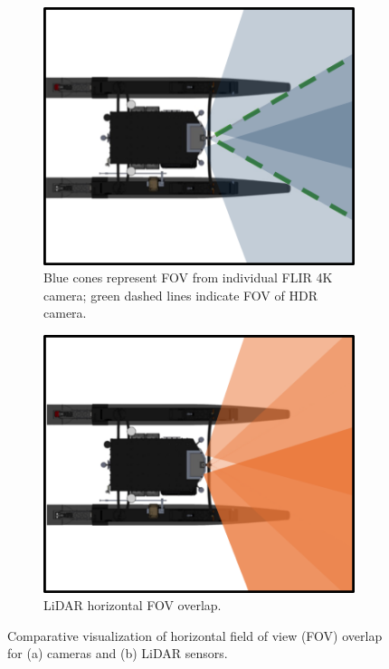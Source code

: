 \documentclass{erauthesis}
\begin{document}
\begin{figure}[htbp]
\centering
\begin{subfigure}[t]{0.45\textwidth}
    \centering
    \includegraphics[width=\textwidth]{Images/fov_cam.png}
    \caption{Blue cones represent FOV from individual FLIR 4K camera; green dashed lines indicate FOV of HDR camera.}
    \label{fig:fov_cam}
\end{subfigure}
\hfill
\begin{subfigure}[t]{0.45\textwidth}
    \centering
    \includegraphics[width=\textwidth]{Images/fov_lidar.png}
    \caption{LiDAR horizontal FOV overlap.}
    \label{fig:fov_lidar}
\end{subfigure}
\caption{Comparative visualization of horizontal field of view (FOV) overlap for (a) cameras and (b) LiDAR sensors.}
\label{fig:fov_combined}
\end{figure}
\end{document}
